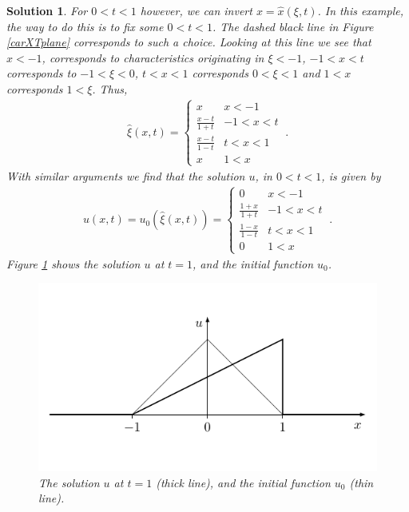 \documentclass[10pt,letterpaper]{article}
\newcommand{\frb}[1]{ \left(  {#1} \right) }
\theoremstyle{break}
\newtheorem{mysolution}{Solution}
\newtheorem*{mysolutioninformation}{Solution Information}
\newenvironment{solution}{\begin{mysolution}}{\end{mysolution}} \newenvironment{solutioninformation}{\begin{mysolutioninformation}}{\end{mysolutioninformation}}
\begin{document}
\begin{solution}
	For $0<t<1$ however, we can invert $x=\hat x\frb{\xi,t}$.
	In this example, the way to do this is to fix some $0<t<1$.
	The dashed black line in Figure \ref{carXTplane} corresponds to such a choice.
	Looking at this line we see that $x<-1$, corresponds to characteristics originating in $\xi<-1$, $-1<x<t$ corresponds to $-1<\xi<0$, $t<x<1$ corresponds $0<\xi<1$ and $1<x$ corresponds $1<\xi$.
	Thus,
	\begin{gather}
		\hat \xi(x,t)=\begin{cases}
				x 	& 	  x<-1\\
				\frac{x-t}{1+t}  	& -1 < x<t\\
				\frac{x-t}{1-t} 	&  t< x<1\\
				x 	&  1 < x
			\end{cases}\ .
	\end{gather}
	With similar arguments we find that the solution $u$, in $0<t<1$, is given by
	\begin{gather}
		u(x,t)=u_0\frb{\hat\xi(x,t)}=
			\begin{cases}
				0 	& 	  x<-1\\
				\frac{1+x}{1+t}  	& -1 < x<t\\
				\frac{1-x}{1-t} 	&  t< x<1\\
				0 	&  1 < x
			\end{cases}\ .
	\end{gather}
	Figure \ref{u01} shows the solution $u$ at $t=1$, and the initial function $u_0$.
	\begin{figure}
	\centering
	\includegraphics[scale=1]{figures01/usol} 
	\caption{The solution $u$ at $t=1$ (thick line), and the initial function $u_0$ (thin line).}
	\label{u01}
	\end{figure}
\end{solution}
\end{document}
